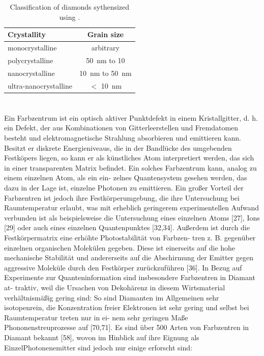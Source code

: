     \begin{table}[htbp]
  		\centering
  		\caption[Classification of diamond synthesized by \cvd]{Classification of diamonds sythensized using \CVD \cite{steinmetz::thesis}.} \label{tab::diamond_grain_sizes}
  			\begin{tabular}{lc}
  			\toprule
  			Crystallity & Grain size  \\
  			\midrule
  			monocrystalline & arbitrary \\
  			polycrystalline & \SI{50}{\nm} to \SI{10}{\mum} \\
  			nanocrystalline & \SI{10}{\nm} to \SI{50}{\nm} \\
  			ultra-nanocrystalline & $<$ \SI{10}{\nm} \\
  			\bottomrule
  			\end{tabular}
  	\end{table}

\section{\sivs} \label{sec::siv}

  Ein Farbzentrum ist ein optisch aktiver Punktdefekt in einem Kristallgitter, d. h. ein Defekt, der aus Kombinationen von Gitterleerstellen und Fremdatomen besteht und elektromagnetische Strahlung absorbieren und emittieren kann. Besitzt er diskrete Energieniveaus, die in der Bandlücke des umgebenden Festköpers liegen, so kann er als künstliches Atom interpretiert werden, das sich in einer transparenten Matrix befindet. Ein solches Farbzentrum kann, analog zu einem einzelnen Atom, als ein ein- zelnes Quantensystem gesehen werden, das dazu in der Lage ist, einzelne Photonen zu emittieren. Ein großer Vorteil der Farbzentren ist jedoch ihre Festkörperumgebung, die ihre Untersuchung bei Raumtemperatur erlaubt, was mit erheblich geringerem experimentellen Aufwand verbunden ist als beispielsweise die Untersuchung eines einzelnen Atoms [27], Ions [29] oder auch eines einzelnen Quantenpunktes [32,34]. Außerdem ist durch die Festkörpermatrix eine erhöhte Photostabilität von Farbzen- tren z. B. gegenüber einzelnen organischen Molekülen gegeben. Diese ist einerseits auf die hohe mechanische Stabilität und andererseits auf die Abschirmung der Emitter gegen aggressive Moleküle durch den Festkörper zurückzuführen [36]. In Bezug auf Experimente zur Quanteninformation sind insbesondere Farbzentren in Diamant at- traktiv, weil die Ursachen von Dekohärenz in diesem Wirtsmaterial verhältnismäßig gering sind: So sind Diamanten im Allgemeinen sehr isotopenrein, die Konzentration freier Elektronen ist sehr gering und selbst bei Raumtemperatur treten nur in ei- nem sehr geringen Maße Phononenstreuprozesse auf [70,71]. Es sind über 500 Arten von Farbzentren in Diamant bekannt [58], wovon im Hinblick auf ihre Eignung als EinzelPhotonenemitter sind jedoch nur einige erforscht sind:

